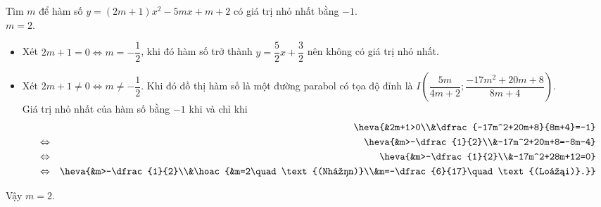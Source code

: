 \begin{bt}%
	Tìm $m$ để hàm số $y=(2m+1)x^2-5mx+m+2$ có giá trị nhỏ nhất bằng $ -1 $.\\
	\dapso $m = 2$.
	\loigiai 
	{
	\begin{itemize}
		\item Xét $2m+1=0\Leftrightarrow m=-\dfrac{1}{2}$, khi đó hàm số trở thành $y=\dfrac{5}{2}x+\dfrac{3}{2}$ nên không có giá trị nhỏ nhất.
		\item Xét $2m+1\ne 0\Leftrightarrow m\ne -\dfrac{1}{2}$. Khi đó đồ thị hàm số là một đường parabol có tọa độ đỉnh là $I\left(\dfrac{5m}{4m+2};\dfrac{-17m^2+20m+8}{8m+4}\right)$.\\
		Giá trị nhỏ nhất của hàm số bằng $-1$ khi và chỉ khi
		\allowdisplaybreaks
		\begin{eqnarray*}
			&&\heva{&2m+1>0\\&\dfrac{-17m^2+20m+8}{8m+4}=-1}\\
			&\Leftrightarrow&\heva{&m>-\dfrac{1}{2}\\&-17m^2+20m+8=-8m-4}\\
			&\Leftrightarrow&\heva{&m>-\dfrac{1}{2}\\&-17m^2+28m+12=0}\\
			&\Leftrightarrow&\heva{&m>-\dfrac{1}{2}\\&\hoac{&m=2\quad \text{(Nhận)}\\&m=-\dfrac{6}{17}\quad \text{(Loại)}.}}
		\end{eqnarray*}
	\end{itemize}
Vậy $m=2$.
}
\end{bt}

